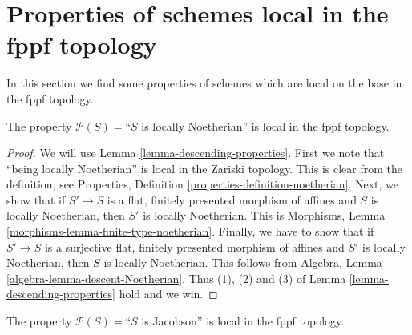 \section{Properties of schemes local in the fppf topology}
\label{section-descending-properties-fppf}

\noindent
In this section we find some properties of schemes which are local on the base
in the fppf topology.

\begin{lemma}
\label{lemma-Noetherian-local-fppf}
The property $\mathcal{P}(S) =$``$S$ is locally Noetherian'' is local
in the fppf topology.
\end{lemma}

\begin{proof}
We will use Lemma \ref{lemma-descending-properties}.
First we note that ``being locally Noetherian'' is local
in the Zariski topology. This is clear from the definition,
see Properties, Definition \ref{properties-definition-noetherian}.
Next, we show that if $S' \to S$ is a flat, finitely presented
morphism of affines and $S$ is locally Noetherian, then $S'$ is
locally Noetherian. This is
Morphisms, Lemma \ref{morphisms-lemma-finite-type-noetherian}.
Finally, we have to show that if $S' \to S$ is a surjective
flat, finitely presented morphism of affines and $S'$ is
locally Noetherian, then $S$ is locally Noetherian. This follows from
Algebra, Lemma \ref{algebra-lemma-descent-Noetherian}.
Thus (1), (2) and (3) of Lemma \ref{lemma-descending-properties} hold
and we win.
\end{proof}

\begin{lemma}
\label{lemma-Jacobson-local-fppf}
The property $\mathcal{P}(S) =$``$S$ is Jacobson'' is local
in the fppf topology.
\end{lemma}

